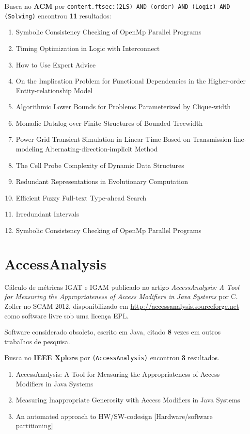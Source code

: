 Busca no {\bf ACM} por
\texttt{content.ftsec:(2LS) AND (order) AND (Logic) AND (Solving)}
encontrou {\bf 11}
resultados:

\begin{enumerate}
\item Symbolic Consistency Checking of OpenMp Parallel Programs
\item Timing Optimization in Logic with Interconnect
\item How to Use Expert Advice
\item On the Implication Problem for Functional Dependencies in the Higher-order Entity-relationship Model
\item Algorithmic Lower Bounds for Problems Parameterized by Clique-width
\item Monadic Datalog over Finite Structures of Bounded Treewidth
\item Power Grid Transient Simulation in Linear Time Based on Transmission-line-modeling Alternating-direction-implicit Method
\item The Cell Probe Complexity of Dynamic Data Structures
\item Redundant Representations in Evolutionary Computation
\item Efficient Fuzzy Full-text Type-ahead Search
\item Irredundant Intervals
\item Symbolic Consistency Checking of OpenMp Parallel Programs
\end{enumerate}

\section{AccessAnalysis}

Cálculo de métricas IGAT e IGAM
publicado no artigo {\it AccessAnalysis: A Tool for Measuring the Appropriateness of Access Modifiers in Java Systems}
por C. Zoller
no SCAM 2012,
disponibilizado em \url{http://accessanalysis.sourceforge.net}
como software livre
sob uma licença EPL.

Software considerado obsoleto,
escrito em Java,
citado {\bf 8} vezes em outros trabalhos de pesquisa.

Busca no {\bf IEEE Xplore} por
\texttt{(AccessAnalysis)}
encontrou {\bf 3}
resultados.

\begin{enumerate}
\item AccessAnalysis: A Tool for Measuring the Appropriateness of Access Modifiers in Java Systems
\item Measuring Inappropriate Generosity with Access Modifiers in Java Systems
\item An automated approach to HW/SW-codesign [Hardware/software partitioning]
\end{enumerate}

